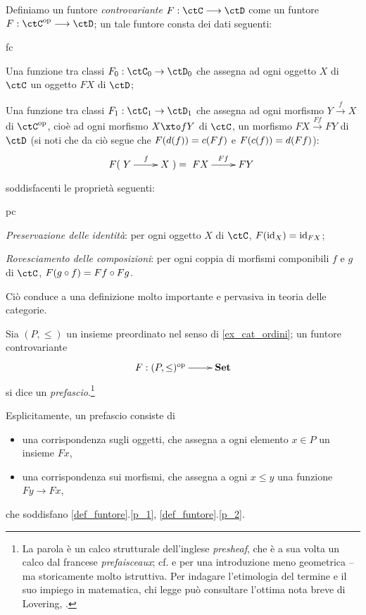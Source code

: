 \begin{definition}\label{def_funtore_contro}
	Definiamo un funtore \emph{controvariante} \(F : \ctC \fun\ctD\) come un funtore \(F : \ctC^\op\fun\ctD\); un tale funtore consta dei dati seguenti:
	\begin{enumtag}{fc}
		\item \label{fc_1} Una funzione tra classi \(F_0 : \ctC_0\to\ctD_0\) che assegna ad ogni oggetto \(X\) di \(\ctC\) un oggetto \(FX\) di \(\ctD\);
		\item \label{fc_2} Una funzione tra classi \(F_1 : \ctC_1\to\ctD_1\) che assegna ad ogni morfismo \(Y \xrightarrow{f} X\) di \(\ctC^\op\), cioè ad ogni morfismo \(X\xto f Y\) di \(\ctC\), un morfismo \(FX \xrightarrow{Ff} FY\) di \(\ctD\) (si noti che da ciò segue che \(F(d(f))=c(Ff)\) e \(F(c(f))=d(Ff)\)):
		\[F(\xymatrix{Y \ar[r]^f & X}) = \xymatrix{FX \ar[r]^{Ff} & FY}\]
	\end{enumtag}
	soddisfacenti le proprietà seguenti:
	\begin{enumtag}{pc}
		\item \label{pc_1} \emph{Preservazione delle identità}: per ogni oggetto \(X\) di \(\ctC\), \(F(\mathrm{id}_X)=\mathrm{id}_{FX}\);
		\item \label{pc_2} \emph{Rovesciamento delle composizioni}: per ogni coppia di morfismi componibili \(f\) e \(g\) di \(\ctC\), \(F(g\circ f)=Ff\circ Fg\).
	\end{enumtag}
\end{definition}
Ciò conduce a una definizione molto importante e pervasiva in teoria delle categorie.
\begin{definition}\label{exa_funtori_da_poset}
	Sia \((P,\le)\) un insieme preordinato nel senso di \ref{ex_cat_ordini}; un funtore controvariante
	\[\xymatrix{F : (P,\le)^\op \ar[r] & \ctSet}\]
	si dice un \emph{prefascio}.\footnote{La parola è un calco strutturale dell'inglese \emph{presheaf}, che è a sua volta un calco dal francese \emph{prefaisceaux}; cf. \cite{Tennison1975,Bredon1997,Godement} e \cite[Cap. ???]{pedicchiofoundations} per una introduzione meno geometrica --ma storicamente molto istruttiva. Per indagare l'etimologia del termine e il suo impiego in matematica, chi legge può consultare l'ottima nota breve di Lovering, \cite{Lovering}.}

	Esplicitamente, un prefascio consiste di
	\begin{itemize}
		\item una corrispondenza sugli oggetti, che assegna a ogni elemento \(x\in P\) un insieme \(Fx\),
		\item una corrispondenza sui morfismi, che assegna a ogni \(x\le y\) una funzione \(Fy\to Fx\),
	\end{itemize}
	che soddisfano \ref{def_funtore}.\ref{p_1}, \ref{def_funtore}.\ref{p_2}.
\end{definition}
